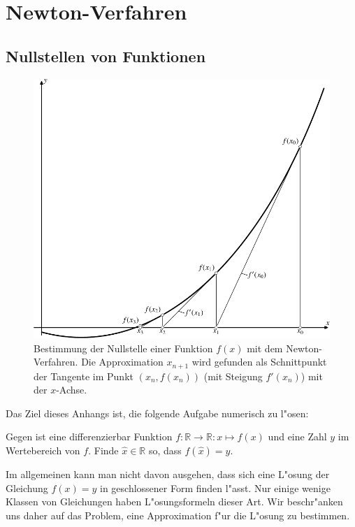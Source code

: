 \chapter{Newton-Verfahren}
\rhead{}

\section{Nullstellen von Funktionen}
\begin{figure}
\centering
\includegraphics{chapters/images/randwert-2.pdf}
\caption{Bestimmung der Nullstelle einer Funktion $f(x)$ mit dem
Newton-Verfahren.
Die Approximation $x_{n+1}$ wird gefunden als Schnittpunkt der Tangente
im Punkt $(x_n,f(x_n))$ (mit Steigung $f'(x_n)$) mit der $x$-Achse.
\label{newton:graphik}}
\end{figure}
Das Ziel dieses Anhangs ist, die folgende Aufgabe numerisch zu l"osen:
\begin{aufgabe}
Gegen ist eine differenzierbar Funktion
$f\colon\mathbb R\to\mathbb R:x\mapsto f(x)$
und eine Zahl $y$ im Wertebereich von $f$.
Finde $\hat{x}\in\mathbb R$ so, dass $f(\hat{x})=y$.
\end{aufgabe}
Im allgemeinen kann man nicht davon ausgehen, dass sich eine L"osung der
Gleichung $f(x)=y$ in geschlossener Form finden l"asst.
Nur einige wenige Klassen von Gleichungen haben L"osungsformeln dieser Art.
Wir beschr"anken uns daher auf das Problem, eine Approximation f"ur die
L"osung zu bestimmen.

